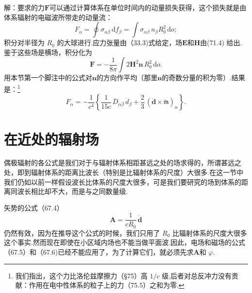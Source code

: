 \begin{xiti}
解：要求的力$\boldsymbol{F}$可以通过计算体系在单位时间内的动量损失获得，这个损失就是由体系辐射的电磁波所带走的动量流：
\begin{equation*}
  F_\alpha=\oint\sigma_{\alpha\beta}\,\mathrm{d}f_\beta=\int\sigma_{\alpha\beta}\,n_\beta R_0^2\,\mathrm{d}o;
\end{equation*}
积分对半径为 $R_0$ 的大球进行.应力张量由（33.3)式给定，场$\boldsymbol{E}$和$\boldsymbol{H}$由(71.4) 给出.鉴于这些场是横场，积分化为
\begin{equation*}
  \boldsymbol{F}=-\frac{1}{8\pi}\int 2\boldsymbol{H}^2\boldsymbol{n}\,R_0^2\,\mathrm{d}o.
\end{equation*}
用本节第一个脚注中的公式对$\boldsymbol{n}$的方向作平均（那里$\boldsymbol{n}$的奇数分量的积为零）.结果是：\footnote{我们指出，这个力比洛伦兹摩擦力（§75）高 $1/c$ 级.后者对总反冲力没有贡献：作用在电中性体系的粒子上的力（75.5）之和为零.}
\begin{equation*}
  F_\alpha=-\frac{1}{c^4}\left\{\frac{1}{15c}\,\dddot{D}_{\alpha\beta}\,\ddot{d}_\beta
  +\frac{2}{3}\,(\ddot{\boldsymbol{d}}\times\ddot{\mathfrak{m}})_\alpha\right\}.
\end{equation*}

\end{xiti}

\section{在近处的辐射场}

偶极辐射的各公式是我们对于与辐射体系相距甚远之处的场求得的，所谓甚远之处，即到辐射体系的距离比波长（特别是比辐射体系的尺度）大很多.在这一节中我们仍如以前一样假设波长比体系的尺度大很多，可是我们要研究的场到体系的距离同波长相比却不大，而是与之同数量级.

矢势的公式（67.4）
\begin{equation}
  \boldsymbol{A}=\frac{1}{cR_0}\,\dot{\boldsymbol{d}}
\end{equation}
仍然有效，因为在推导这个公式的时候，我们只用了 $R_0$ 比辐射体系的尺度大很多这个事实.然而现在即使在小区域内场也不能当做平面波.因此，电场和磁场的公式（67.5）和（67.6)已经不能应用了，为了计算它们，就必须先求$\boldsymbol{A}$和 $\varphi$.

